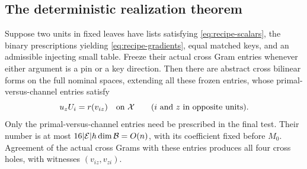 \subsection{The deterministic realization theorem}

\begin{theorem}\label{thm:gradient-realization}
Suppose two units in fixed leaves have lists satisfying
\eqref{eq:recipe-scalars}, the binary prescriptions yielding
\eqref{eq:recipe-gradients}, equal matched keys, and an
admissible injecting small table.  Freeze their actual cross
Gram entries whenever either argument is a pin or a key
direction.  Then there are abstract cross bilinear forms on
the full nominal spaces, extending all these frozen entries,
whose primal-versus-channel entries satisfy
\begin{equation}\label{eq:realized-gradients}
 u_zU_i=r(v_{iz})\quad\text{on }\mathcal X
 \qquad(i\text{ and }z\text{ in opposite units}).
\end{equation}
Only the primal-versus-channel entries need be prescribed in
the final test.  Their number is at most
$16|\mathcal E|h\dim\mathcal B=O(n)$, with its coefficient fixed before
$M_0$.  Agreement of the actual cross Grams with these entries
produces all four cross holes, with witnesses $(v_{iz},v_{zi})$.
\end{theorem}
